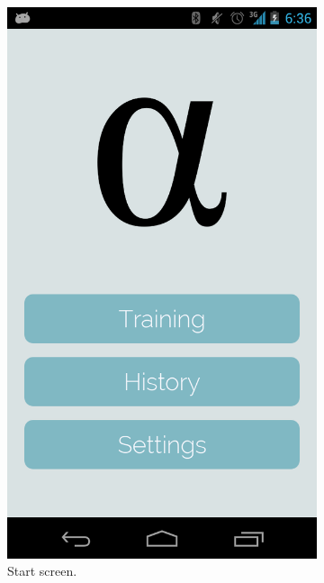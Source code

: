 \documentclass[a4paper,10pt,english,lof,lot,twoside]{puthesis}
\begin{document}
\begin{figure}
\centering
\capstart
\begin{subfigure}[t]{0.30\linewidth}
\centering
\capstart

\includegraphics[width=0.800\linewidth]{final-prototype-start.png}
\caption[Start screen]{Start screen.}\label{ch-design/index:fig-final-prototype-app-flow-app-screen-start}\end{subfigure}
\begin{subfigure}[t]{0.30\linewidth}
\centering
\capstart


\end{subfigure}
\end{figure}
\end{document}
